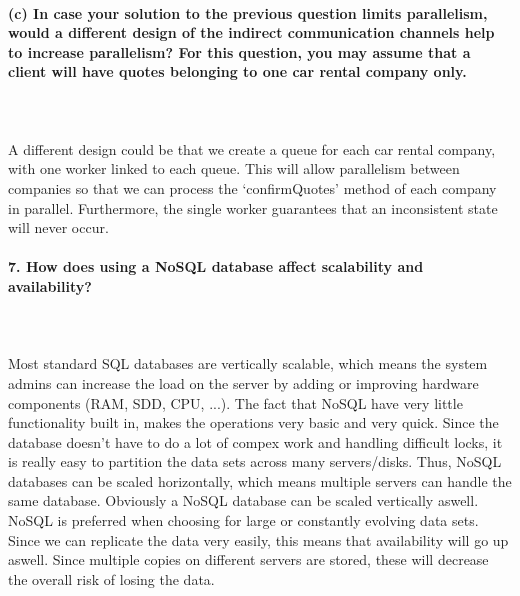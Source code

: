 \documentclass{ds-report}
\begin{document}
\paragraph{(c) In case your solution to the previous question limits parallelism, would a different design of
the indirect communication channels help to increase parallelism? For this question, you may
assume that a client will have quotes belonging to one car rental company only.}\mbox{}\\\\
A different design could be that we create a queue for each car rental company, with one worker linked to each queue. This will allow parallelism between companies so that we can process the `confirmQuotes' method of each company in parallel. Furthermore, the single worker guarantees that an inconsistent state will never occur.
 

	\paragraph{7.  How does using a NoSQL database affect scalability and availability?} \mbox{}\\\\
Most standard SQL databases are vertically scalable, which means the system admins can increase the load on the server by adding or improving hardware components (RAM, SDD, CPU, ...).  
	The fact that NoSQL have very little functionality built in, makes the operations very basic and very quick. Since the database doesn't have to do a lot of compex work and handling difficult locks, it is really easy to partition the data sets across many servers/disks. Thus, NoSQL databases can be scaled horizontally, which means multiple servers can handle the same database. Obviously a NoSQL database can be scaled vertically aswell. NoSQL is preferred when choosing for large or constantly evolving data sets.\mbox{}\\
Since we can replicate the data very easily, this means that availability will go up aswell. Since multiple copies on different servers are stored, these will decrease the overall risk of losing the data.
	
\end{document}
